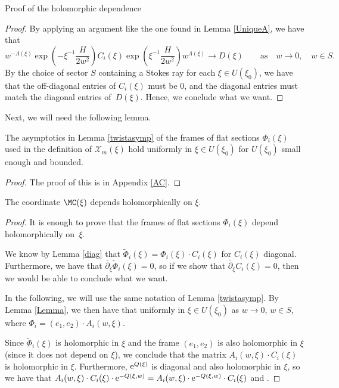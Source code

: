 \begin{subsubsection}{Proof of the holomorphic dependence}
\begin{proof}
By applying an argument like the one found in Lemma \ref{UniqueA}, we have that
\begin{equation*}
 w^{-\Lambda(\xi)}\exp \left(-\xi^{-1}\frac{H}{2w^2}\right)C_i(\xi)\exp \left(\xi^{-1}\frac{H}{2w^2}\right)w^{\Lambda(\xi)} \to D(\xi) \qquad \text{as} \quad w\to 0,\quad w\in S.
\end{equation*}
By the choice of sector $S$ containing a Stokes ray for each $\xi \in U(\xi_0)$, we have that the off-diagonal entries of $C_i(\xi)$ must be $0$, and the diagonal entries must match the diagonal entries of~$D(\xi)$. Hence, we conclude what we want.
\end{proof}

Next, we will need the following lemma.

\begin{Lemma} \label{Lemma} The asymptotics in Lemma {\rm\ref{twistasymp}} of the frames of flat sections $\Phi_i(\xi)$ used in the definition of $\mathcal{X}_m(\xi)$ hold uniformly in $\xi \in U(\xi_0)$ for $U(\xi_0)$ small enough and bounded.
\end{Lemma}

\begin{proof}
The proof of this is in Appendix \ref{AC}.
\end{proof}

\begin{Theorem} The coordinate $\MC(\xi)$ depends holomorphically on $\xi$.
\end{Theorem}

\begin{proof}
It is enough to prove that the frames of flat sections $\Phi_i(\xi)$ depend holomorphically on~$\xi$.

We know by Lemma \ref{diag} that $\widetilde{\Phi}_i(\xi)=\Phi_i(\xi)\cdot C_i(\xi)$ for $C_i(\xi)$ diagonal. Furthermore, we have that $\overline{\partial}_{\xi}\widetilde{\Phi}_i(\xi)=0$, so if we show that $\overline{\partial}_{\xi}C_i(\xi)=0$, then we would be able to conclude what we want.

In the following, we will use the same notation of Lemma \ref{twistasymp}. By Lemma \ref{Lemma}, we then have that
 uniformly in $\xi \in U(\xi_0)$ as $ w\to 0$, $w\in S$,
where $\Phi_i=(e_1,e_2)\cdot A_i(w,\xi)$.

Since $\widetilde{\Phi}_i(\xi)$ is holomorphic in $\xi$ and the frame $(e_1,e_2)$ is also holomorphic in $\xi$ (since it does not depend on $\xi$), we conclude that the matrix $A_i(w,\xi)\cdot C_i(\xi)$ is holomorphic in $\xi$. Furthermore, ${\rm e}^{Q(\xi)}$ is diagonal and also holomorphic in $\xi$, so we have that $\smash{A_i(w,\xi)\cdot C_i(\xi)\cdot {\rm e}^{-Q(\xi,w)}}=\smash{A_i(w,\xi)\cdot {\rm e}^{-Q(\xi,w)}\cdot C_i(\xi)}$ and .


\end{proof}
\end{subsubsection}
